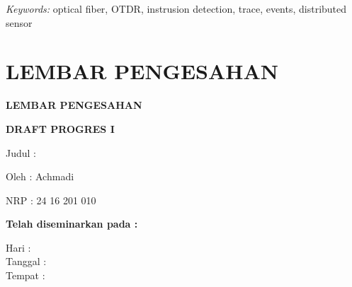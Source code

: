 \documentclass[12pt]{article}
\providecommand{\keyworden}[1]{\textit{Keywords: } #1}
\begin{document}
	\keyworden{optical fiber, OTDR, instrusion detection, trace, events, distributed sensor}
	
\newpage
\thispagestyle{plain}
\mbox{}

\newpage

	\section{LEMBAR PENGESAHAN}
	
	\begin{center}
		\textbf{LEMBAR PENGESAHAN}
	\end{center}
	
	\begin{center}
		\textbf{DRAFT PROGRES I}
	\end{center}

	\vspace{10pt}

	\begin{flushleft}
		\hspace{50pt} Judul	: 
	\end{flushleft}

	\begin{flushleft}
		\hspace{50pt} Oleh : Achmadi
	\end{flushleft}

	\begin{flushleft}
		\hspace{50pt} NRP : 24 16 201 010
	\end{flushleft}

	\vspace{20pt}
	
	\begin{center}
		\textbf{Telah diseminarkan pada :}
	\end{center}

	\vspace{10pt}

	\begin{flushleft}
		Hari \hspace{17pt}: \\
		Tanggal :\\
		Tempat \hspace{3pt}:  \\
	\end{flushleft}
\end{document}
